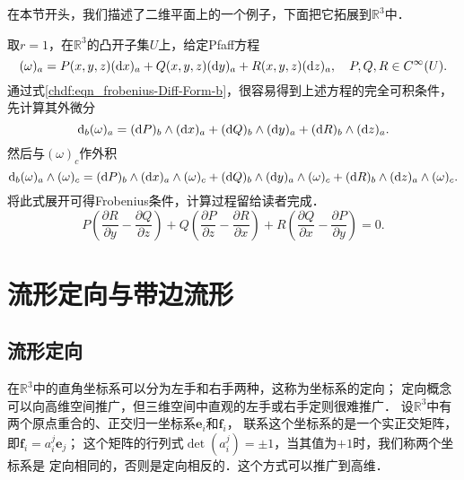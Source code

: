 在本节开头，我们描述了二维平面上的一个例子，下面把它拓展到$\mathbb{R}^3$中．
\begin{example}
    取$r=1$，在$\mathbb{R}^3$的凸开子集$U$上，给定Pfaff方程
    \begin{equation*}
        (\omega)_a = P(x,y,z)({\rm d}x)_a +Q(x,y,z)({\rm d}y)_a +R(x,y,z)({\rm d}z)_a  , \quad P,Q,R\in C^\infty(U).
    \end{equation*}
    通过式\eqref{chdf:eqn_frobenius-Diff-Form-b}，很容易得到上述方程的完全可积条件，先计算其外微分
    \begin{equation}
        {\rm d}_b (\omega)_a = ({\rm d}P)_b\wedge({\rm d}x)_a +({\rm d}Q)_b\wedge({\rm d}y)_a +({\rm d}R)_b\wedge ({\rm d}z)_a .
    \end{equation}
    然后与$(\omega)_c$作外积
    \begin{equation*}
        {\rm d}_b (\omega)_a \wedge(\omega)_c= ({\rm d}P)_b\wedge({\rm d}x)_a \wedge(\omega)_c
          +({\rm d}Q)_b\wedge({\rm d}y)_a\wedge(\omega)_c +({\rm d}R)_b\wedge ({\rm d}z)_a\wedge(\omega)_c .
    \end{equation*}
    将此式展开可得Frobenius条件，计算过程留给读者完成．
    \begin{equation}
        P\left(\frac{\partial R}{\partial y} - \frac{\partial Q}{\partial z} \right)
       +Q\left(\frac{\partial P}{\partial z} - \frac{\partial R}{\partial x} \right)
       +R\left(\frac{\partial Q}{\partial x} - \frac{\partial P}{\partial y} \right) =0.
    \end{equation}
\end{example}



\section{流形定向与带边流形}\label{chdf:sec_oriented-manifold}
\subsection{流形定向}
在$\mathbb{R}^3$中的直角坐标系可以分为左手和右手两种，这称为坐标系的{\kaishu 定向}；
定向概念可以向高维空间推广，但三维空间中直观的左手或右手定则很难推广．
设$\mathbb{R}^3$中有两个原点重合的、正交归一坐标系$\boldsymbol{e}_i$和$\boldsymbol{f}_i$，
联系这个坐标系的是一个实正交矩阵，即$\boldsymbol{f}_i = a_i^j \boldsymbol{e}_j$；
这个矩阵的行列式$\det (a_i^j)=\pm 1$，当其值为$+1$时，我们称两个坐标系是
定向相同的，否则是定向相反的．这个方式可以推广到高维．


